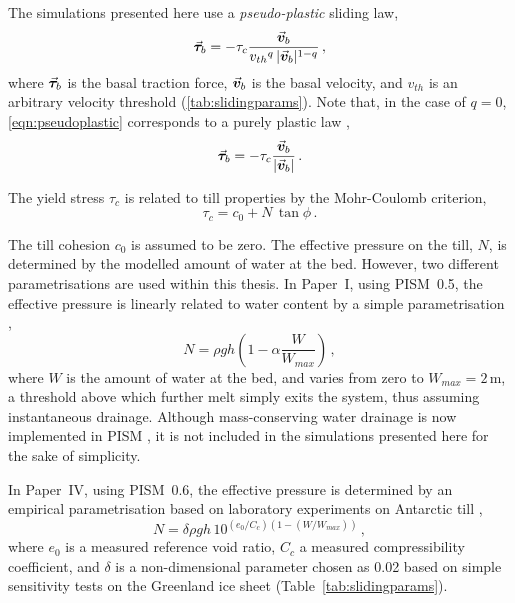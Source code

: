 \documentclass{article}
\newcommand{\vect}[1]{\va*{#1}} %
\newcommand{\vv}[0]{\vect{v}}           %
\newcommand{\CCLI}[0]{Paper~I}      %
\newcommand{\CCYC}[0]{Paper~IV}     %
\begin{document}
The simulations presented here use a \emph{pseudo-plastic} sliding law,
\begin{equation}
    \label{eqn:pseudoplastic}
    \vect{\tau}_b = -\tau_c \frac{\vv_b}{{v_{th}}^q\,|\vv_b|^{1-q}} \,,
\end{equation}
where $\vect{\tau}_b$ is the basal traction force, $\vv_b$ is the basal
velocity, and $v_{th}$ is an arbitrary velocity threshold
(\cref{tab:slidingparams}). Note that, in the case of
$q=0$, \cref{eqn:pseudoplastic} corresponds to a purely plastic law
\citep[Eq.~11]{Winkelmann.etal.2011},
\begin{equation}
    \label{eqn:plastic}
    \vect{\tau}_b = -\tau_c \frac{\vv_b}{|\vv_b|} \,.
\end{equation}

The yield stress $\tau_c$ is related to till properties by the Mohr-Coulomb
criterion,
\begin{equation}
    \label{eqn:coulomb}
    \tau_c = c_0 + N\,\tan{\phi} \,.
\end{equation}

The till cohesion $c_0$ is assumed to be zero.
The effective pressure on the
till, $N$, is determined by the modelled amount of water at the bed. However,
two different parametrisations are used within this thesis. In {\CCLI}, using
PISM~0.5, the effective pressure is linearly related to water content by a
simple parametrisation \citep[Eq.~13]{Winkelmann.etal.2011},
\begin{equation}
    N = \rho gh (1 - \alpha \frac{W}{W_{max}}) \,,
\end{equation}
where $W$ is the amount of water at the bed, and varies from zero to
$W_{max}=2$\,m, a threshold above which further melt simply exits the system,
thus assuming instantaneous drainage. Although mass-conserving water drainage
is now implemented in PISM \citep{Bueler.Pelt.2014}, it is not included in the
simulations presented here for the sake of simplicity.

In {\CCYC}, using PISM~0.6, the effective pressure is determined by an
empirical parametrisation based on laboratory experiments on Antarctic till
\citep{Tulaczyk.etal.2000, Bueler.Pelt.2014},
\begin{equation}
    N = \delta \rho gh \, 10^{(e_0/C_c) (1 - (W/W_{max}))} \,,
\end{equation}
where $e_0$ is a measured reference void ratio, $C_c$ a measured
compressibility coefficient, and $\delta$ is a non-dimensional parameter
chosen as 0.02 based on simple sensitivity tests on the Greenland ice sheet
(Table~\ref{tab:slidingparams}).
\end{document}
